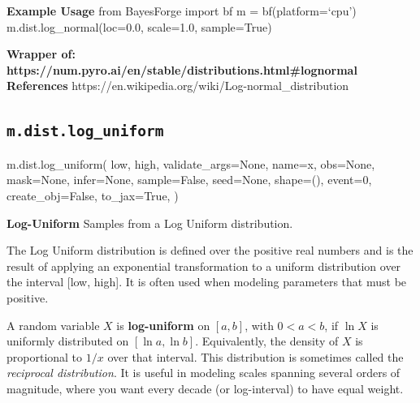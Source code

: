 \documentclass[
  letterpaper,
  DIV=11,
  numbers=noendperiod]{scrartcl}
\newenvironment{Shaded}{\begin{snugshade}}{\end{snugshade}}
\newcommand{\DecValTok}[1]{\textcolor[rgb]{0.68,0.00,0.00}{#1}}
\newcommand{\NormalTok}[1]{\textcolor[rgb]{0.00,0.23,0.31}{#1}}
\newcommand{\OperatorTok}[1]{\textcolor[rgb]{0.37,0.37,0.37}{#1}}
\newcommand{\StringTok}[1]{\textcolor[rgb]{0.13,0.47,0.30}{#1}}
\newcommand{\VariableTok}[1]{\textcolor[rgb]{0.07,0.07,0.07}{#1}}
\begin{document}
\textbf{Example Usage} from BayesForge import bf m = bf(platform=`cpu')
m.dist.log\_normal(loc=0.0, scale=1.0, sample=True)

\textbf{Wrapper of:
https://num.pyro.ai/en/stable/distributions.html\#lognormal}
\textbf{References}
https://en.wikipedia.org/wiki/Log-normal\_distribution

\subsection{\texorpdfstring{\texttt{m.dist.log\_uniform}}{m.dist.log\_uniform}}\label{log_uniform}

\begin{Shaded}
\begin{Highlighting}[]
\NormalTok{m.dist.log\_uniform(}
\NormalTok{    low,}
\NormalTok{    high,}
\NormalTok{    validate\_args}\OperatorTok{=}\VariableTok{None}\NormalTok{,}
\NormalTok{    name}\OperatorTok{=}\StringTok{\textquotesingle{}x\textquotesingle{}}\NormalTok{,}
\NormalTok{    obs}\OperatorTok{=}\VariableTok{None}\NormalTok{,}
\NormalTok{    mask}\OperatorTok{=}\VariableTok{None}\NormalTok{,}
\NormalTok{    infer}\OperatorTok{=}\VariableTok{None}\NormalTok{,}
\NormalTok{    sample}\OperatorTok{=}\VariableTok{False}\NormalTok{,}
\NormalTok{    seed}\OperatorTok{=}\VariableTok{None}\NormalTok{,}
\NormalTok{    shape}\OperatorTok{=}\NormalTok{(),}
\NormalTok{    event}\OperatorTok{=}\DecValTok{0}\NormalTok{,}
\NormalTok{    create\_obj}\OperatorTok{=}\VariableTok{False}\NormalTok{,}
\NormalTok{    to\_jax}\OperatorTok{=}\VariableTok{True}\NormalTok{,}
\NormalTok{)}
\end{Highlighting}
\end{Shaded}

\textbf{Log-Uniform} Samples from a Log Uniform distribution.

The Log Uniform distribution is defined over the positive real numbers
and is the result of applying an exponential transformation to a uniform
distribution over the interval {[}low, high{]}. It is often used when
modeling parameters that must be positive.

A random variable \(X\) is \textbf{log-uniform} on \([a, b]\), with
\(0 < a < b\), if \(\ln X\) is uniformly distributed on
\([\ln a, \ln b]\). Equivalently, the density of \(X\) is proportional
to \(1/x\) over that interval. This distribution is sometimes called the
\emph{reciprocal distribution}. It is useful in modeling scales spanning
several orders of magnitude, where you want every decade (or
log-interval) to have equal weight.
\end{document}
